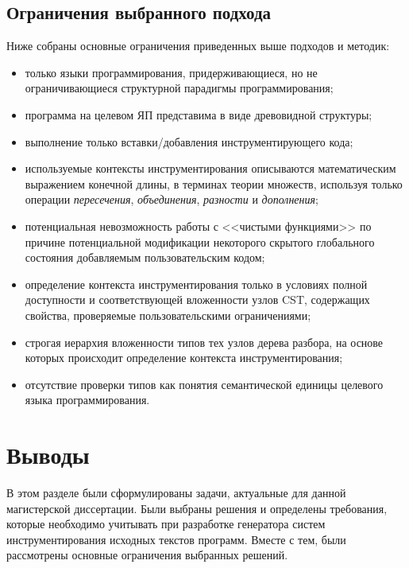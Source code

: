 \subsection{Ограничения выбранного подхода}

Ниже собраны основные ограничения приведенных выше подходов и методик:
\begin{itemize}[noitemsep]
  \item только языки программирования, придерживающиеся, но не ограничивающиеся структурной парадигмы программирования;
  \item программа на целевом ЯП представима в виде древовидной структуры;
  \item выполнение только вставки/добавления инструментирующего кода;
  \item используемые контексты инструментирования описываются математическим выражением конечной длины, в терминах теории множеств, используя только операции \textit{пересечения}, \textit{объединения}, \textit{разности} и \textit{дополнения};
  \item потенциальная невозможность работы с <<чистыми функциями>> по причине потенциальной модификации некоторого скрытого глобального состояния добавляемым пользовательским кодом;
  \item определение контекста инструментирования только в условиях полной доступности и соответствующей вложенности узлов CST, содержащих свойства, проверяемые пользовательскими ограничениями;
  \item строгая иерархия вложенности типов тех узлов дерева разбора, на основе которых происходит определение контекста инструментирования;
  \item отсутствие проверки типов как понятия семантической единицы целевого языка программирования.
\end{itemize}

\section{Выводы}

В этом разделе были сформулированы задачи, актуальные для данной магистерской диссертации.
Были выбраны решения и определены требования, которые необходимо учитывать при разработке генератора систем инструментирования исходных текстов программ.
Вместе с тем, были рассмотрены основные ограничения выбранных решений.
